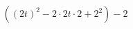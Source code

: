 \documentclass[preview]{standalone}
\begin{document}
\begin{align*}
\left(\left(2 t\right)^2-2\cdot 2 t\cdot 2+2^2\right)-2
\end{align*}
\end{document}
